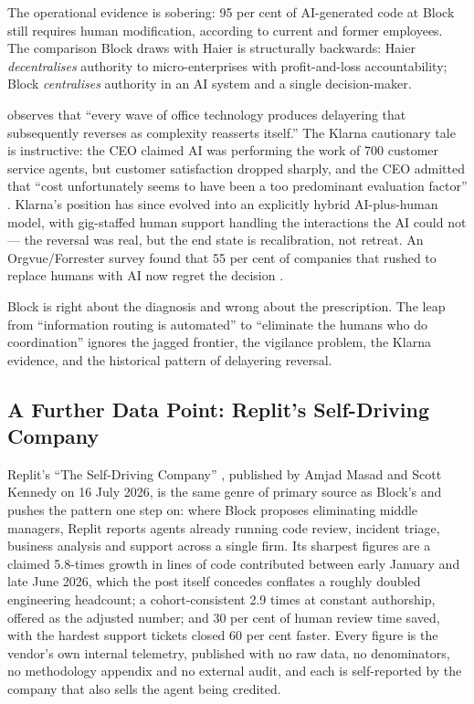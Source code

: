 The operational evidence is sobering: 95 per cent of AI-generated code at Block still requires human modification, according to current and former employees. The comparison Block draws with Haier is structurally backwards: Haier \emph{decentralises} authority to micro-enterprises with profit-and-loss accountability; Block \emph{centralises} authority in an AI system and a single decision-maker.

\textcite{Spicer2026} observes that ``every wave of office technology produces delayering that subsequently reverses as complexity reasserts itself.'' The Klarna cautionary tale is instructive: the CEO claimed AI was performing the work of 700 customer service agents, but customer satisfaction dropped sharply, and the CEO admitted that ``cost unfortunately seems to have been a too predominant evaluation factor'' \parencite{Klarna2025}. Klarna's position has since evolved into an explicitly hybrid AI-plus-human model, with gig-staffed human support handling the interactions the AI could not \parencite{KlarnaHybrid2026} --- the reversal was real, but the end state is recalibration, not retreat. An Orgvue/Forrester survey found that 55 per cent of companies that rushed to replace humans with AI now regret the decision \parencite{OrgvueForrester2025}.

\begin{cautionbox}
Block is right about the diagnosis and wrong about the prescription. The leap from ``information routing is automated'' to ``eliminate the humans who do coordination'' ignores the jagged frontier, the vigilance problem, the Klarna evidence, and the historical pattern of delayering reversal.
\end{cautionbox}

\subsection{A Further Data Point: Replit's Self-Driving Company}

Replit's ``The Self-Driving Company'' \parencite{MasadKennedy2026}, published by Amjad Masad and Scott Kennedy on 16 July 2026, is the same genre of primary source as Block's and pushes the pattern one step on: where Block proposes eliminating middle managers, Replit reports agents already running code review, incident triage, business analysis and support across a single firm. Its sharpest figures are a claimed 5.8-times growth in lines of code contributed between early January and late June 2026, which the post itself concedes conflates a roughly doubled engineering headcount; a cohort-consistent 2.9 times at constant authorship, offered as the adjusted number; and 30 per cent of human review time saved, with the hardest support tickets closed 60 per cent faster. Every figure is the vendor's own internal telemetry, published with no raw data, no denominators, no methodology appendix and no external audit, and each is self-reported by the company that also sells the agent being credited.

